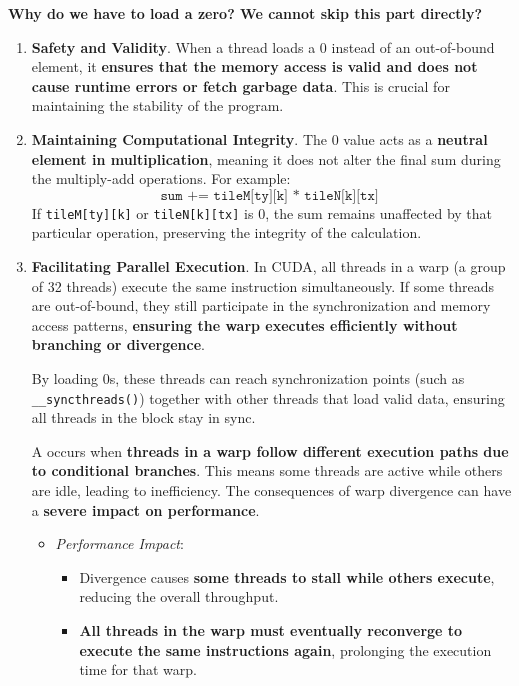 \highspace
\begin{flushleft}
    \textcolor{Green3}{ \textbf{Why do we have to load a zero? We cannot skip this part directly?}}
\end{flushleft}
\begin{enumerate}
    \item \textbf{Safety and Validity}. When a thread loads a 0 instead of an out-of-bound element, it \textbf{ensures that the memory access is valid and does not cause runtime errors or fetch garbage data}. This is crucial for maintaining the stability of the program.

    \item \textbf{Maintaining Computational Integrity}. The 0 value acts as a \textbf{neutral element in multiplication}, meaning it does not alter the final sum during the multiply-add operations. For example:
    \begin{equation*}
        \texttt{
            sum += tileM[ty][k] * tileN[k][tx]
        }
    \end{equation*}
    If \texttt{tileM[ty][k]} or \texttt{tileN[k][tx]} is 0, the sum remains unaffected by that particular operation, preserving the integrity of the calculation.
    
    \item \textbf{Facilitating Parallel Execution}. In CUDA, all threads in a warp (a group of 32 threads) execute the same instruction simultaneously. If some threads are out-of-bound, they still participate in the synchronization and memory access patterns, \textbf{ensuring the warp executes efficiently without branching or divergence}.
    
    By loading 0s, these threads can reach synchronization points (such as \texttt{\_\_syncthreads()}) together with other threads that load valid data, ensuring all threads in the block stay in sync.

    A  occurs when \textbf{threads in a warp follow different execution paths due to conditional branches}. This means some threads are active while others are idle, leading to inefficiency. The consequences of warp divergence can have a \textbf{severe impact on performance}.
    \begin{itemize}
        \item \emph{Performance Impact}:
        \begin{itemize}
            \item Divergence causes \textbf{some threads to stall while others execute}, reducing the overall throughput.
            \item \textbf{All threads in the warp must eventually reconverge to execute the same instructions again}, prolonging the execution time for that warp.
        \end{itemize}


\end{itemize}
\end{enumerate}
